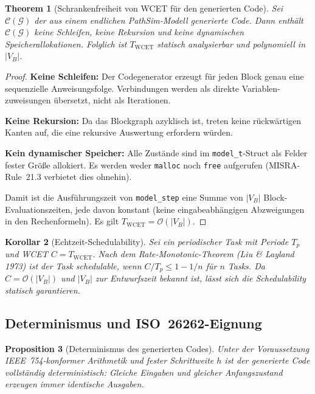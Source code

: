 ﻿\documentclass[12pt,a4paper]{article}
\newtheorem{theorem}{Theorem}[section]
\newtheorem{korollar}[theorem]{Korollar}
\newtheorem{proposition}[theorem]{Proposition}
\theoremstyle{definition}
\begin{document}
\begin{theorem}[Schrankenfreiheit von WCET für den generierten Code]
\label{thm:wcet}
Sei $\mathcal{C}(\mathcal{G})$ der aus einem endlichen PathSim-Modell generierte
Code. Dann enthält $\mathcal{C}(\mathcal{G})$ keine Schleifen, keine
Rekursion und keine dynamischen Speicherallokationen. Folglich ist
$T_{\mathrm{WCET}}$ statisch analysierbar und polynomiell in $|V_B|$.
\end{theorem}

\begin{proof}
\textbf{Keine Schleifen:} Der Codegenerator erzeugt für jeden Block genau
eine sequenzielle Anweisungsfolge. Verbindungen werden als direkte Variablen-
zuweisungen übersetzt, nicht als Iterationen.

\textbf{Keine Rekursion:} Da das Blockgraph azyklisch ist, treten keine
rückwärtigen Kanten auf, die eine rekursive Auswertung erfordern würden.

\textbf{Kein dynamischer Speicher:} Alle Zustände sind im \texttt{model\_t}-Struct
als Felder fester Grö\ss{}e allokiert. Es werden weder \texttt{malloc} noch
\texttt{free} aufgerufen (MISRA-Rule~21.3 verbietet dies ohnehin).

Damit ist die Ausführungszeit von \texttt{model\_step} eine Summe von
$|V_B|$ Block-Evaluations\-zeiten, jede davon konstant (keine
eingabeabhängigen Abzweigungen in den Rechenformeln). Es gilt
$T_{\mathrm{WCET}} = \mathcal{O}(|V_B|)$.
\end{proof}

\begin{korollar}[Echtzeit-Schedulability]
Sei ein periodischer Task mit Periode $T_p$ und WCET $C = T_{\mathrm{WCET}}$.
Nach dem Rate-Monotonic-Theorem (Liu \& Layland 1973) ist der Task schedulable,
wenn $C / T_p \leq 1 - 1/n$ für $n$ Tasks. Da $C = \mathcal{O}(|V_B|)$ und
$|V_B|$ zur Entwurfszeit bekannt ist, lässt sich die Schedulability statisch
garantieren.
\end{korollar}

\subsection{Determinismus und ISO~26262-Eignung}

\begin{proposition}[Determinismus des generierten Codes]
\label{prop:det}
Unter der Voraussetzung IEEE~754-konformer Arithmetik und fester Schrittweite $h$
ist der generierte Code \emph{vollständig deterministisch}: Gleiche Eingaben
und gleicher Anfangszustand erzeugen immer identische Ausgaben.
\end{proposition}
\end{document}
